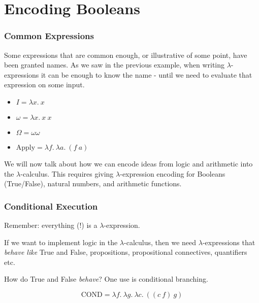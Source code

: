 \documentclass{beamer}
\begin{document}
\section{Encoding Booleans}
\begin{frame}
	\frametitle{Common Expressions}

	Some expressions that are common enough, or illustrative of some point, have been granted names. As we saw in the previous example, when writing $\lambda$-expressions it can be enough to know the name - until we need to evaluate that expression on some input. 

	\vspace{0.5cm}

	\begin{itemize}
		\item[] $I = \lambda x. \ x$
		\item[] $\omega = \lambda x. \ x \ x$
		\item[] $\Omega = \omega \omega$
		\item[] $\text{Apply} = \lambda f. \ \lambda a. \ (f \ a)$
	\end{itemize}

	\vspace{0.5cm}

	We will now talk about how we can encode ideas from logic and arithmetic into the $\lambda$-calculus. This requires giving $\lambda$-expression encoding for Booleans (True/False), natural numbers, and arithmetic functions.

\end{frame}

\begin{frame}
	\frametitle{Conditional Execution}

	Remember: everything (!) is a $\lambda$-expression. 

	\vspace{0.5cm}

	If we want to implement logic in the $\lambda$-calculus, then we need $\lambda$-expressions that \emph{behave like} True and False, propositions, propositional connectives, quantifiers etc.

	\vspace{0.5cm}

	How do True and False \emph{behave}? One use is conditional branching.

	$$\text{COND} = \lambda f. \ \lambda g. \ \lambda c. \ ((c \ f) \ g) $$

	\vspace{3cm}

\end{frame}
\end{document}
